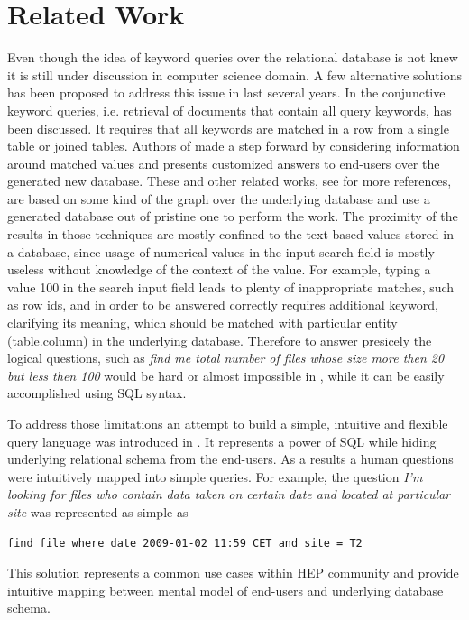 \documentclass[1p,times]{elsarticle}
\begin{document}

\section{Related Work\label{RelatedWork}}
Even though the idea of keyword queries over the relational database
is not knew it is still under discussion in computer science domain.
A few alternative solutions has been proposed to address this issue
in last several years. In \cite{DBXplorer} the conjunctive keyword queries,
i.e. retrieval of documents that contain all query keywords, has
been discussed. It requires that all keywords are matched in a row from a
single table or joined tables. Authors of \cite{QueryAnswer} made a step forward
by considering information around matched values and presents customized answers to
end-users over the generated new database. These and other related 
works, see \cite{DBXplorer, QueryAnswer} for more references,
are based on some kind of the graph over the underlying database and
use a generated database out of pristine one to perform the work.
The proximity of the results in those techniques 
are mostly confined to the text-based values stored in a database, since 
usage of numerical values in the input search field is mostly useless without 
knowledge of the context of the value. For example, typing a value 100 
in the search input field leads to plenty of inappropriate matches, 
such as row ids, and in order to be
answered correctly requires additional keyword, clarifying its meaning, 
which should be matched with particular
entity (table.column) in the underlying database.
Therefore to answer presicely the logical questions, such as  
{\it find me total number of files whose size more then 20 but less then 
100} would be hard or almost impossible in \cite{DBXplorer, QueryAnswer}, 
while it can be easily accomplished using SQL syntax. 

To address those limitations an attempt to build a simple, intuitive and 
flexible query language was introduced in \cite{DBS-QL}.
It represents a power of SQL while hiding underlying relational schema from 
the end-users. As a results a human questions were intuitively mapped into 
simple queries. For example, the question
{\it I'm looking for files who contain data taken on certain date and located at
particular site} was represented as simple as \cite{DBS-QL}
\begin{verbatim}
find file where date 2009-01-02 11:59 CET and site = T2
\end{verbatim}
This solution represents a common use cases within HEP community and provide
intuitive mapping between mental model of end-users and underlying database schema.
\end{document}

